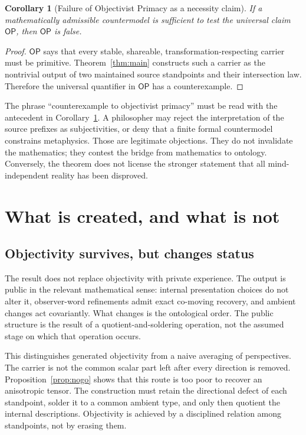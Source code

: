 \documentclass[11pt]{article}
\newtheorem{corollary}[theorem]{Corollary}
\theoremstyle{definition}
\theoremstyle{remark}
\newcommand{\OPT}{\mathsf{OP}}
\begin{document}
\begin{corollary}[Failure of Objectivist Primacy as a necessity claim]\label{cor:counterexample}
If a mathematically admissible countermodel is sufficient to test the universal claim $\OPT$, then $\OPT$ is false.
\end{corollary}

\begin{proof}
$\OPT$ says that every stable, shareable, transformation-respecting carrier must be primitive. Theorem~\ref{thm:main} constructs such a carrier as the nontrivial output of two maintained source standpoints and their intersection law. Therefore the universal quantifier in $\OPT$ has a counterexample.
\end{proof}

The phrase ``counterexample to objectivist primacy'' must be read with the antecedent in Corollary~\ref{cor:counterexample}. A philosopher may reject the interpretation of the source prefixes as subjectivities, or deny that a finite formal countermodel constrains metaphysics. Those are legitimate objections. They do not invalidate the mathematics; they contest the bridge from mathematics to ontology. Conversely, the theorem does not license the stronger statement that all mind-independent reality has been disproved.

\section{What is created, and what is not}

\subsection{Objectivity survives, but changes status}

The result does not replace objectivity with private experience. The output is public in the relevant mathematical sense: internal presentation choices do not alter it, observer-word refinements admit exact co-moving recovery, and ambient changes act covariantly. What changes is the ontological order. The public structure is the result of a quotient-and-soldering operation, not the assumed stage on which that operation occurs.

This distinguishes generated objectivity from a naive averaging of perspectives. The carrier is not the common scalar part left after every direction is removed. Proposition~\ref{prop:nogo} shows that this route is too poor to recover an anisotropic tensor. The construction must retain the directional defect of each standpoint, solder it to a common ambient type, and only then quotient the internal descriptions. Objectivity is achieved by a disciplined relation among standpoints, not by erasing them.
\end{document}
